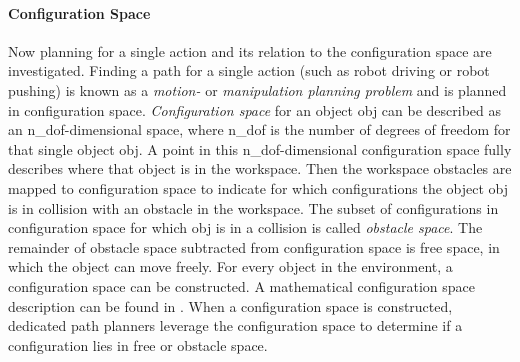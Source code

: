\paragraph{Configuration Space}
Now planning for a single action and its relation to the configuration space are investigated. Finding a path for a single action (such as robot driving or robot pushing) is known as a \textit{motion-} or \textit{manipulation planning problem} and is planned in configuration space. \textit{Configuration space} for an object \gls{obj} can be described as an \gls{n_dof}-dimensional space, where \gls{n_dof} is the number of degrees of freedom for that single object \gls{obj}. A point in this \gls{n_dof}-dimensional configuration space fully describes where that object is in the workspace. Then the workspace obstacles are mapped to configuration space to indicate for which configurations the object \gls{obj} is in collision with an obstacle in the workspace. The subset of configurations in configuration space for which \gls{obj} is in a collision is called \textit{obstacle space}. The remainder of obstacle space subtracted from configuration space is free space, in which the object can move freely. For every object in the environment, a configuration space can be constructed. A mathematical configuration space description can be found in . When a configuration space is constructed, dedicated path planners leverage the configuration space to determine if a configuration lies in free or obstacle space.\bs

